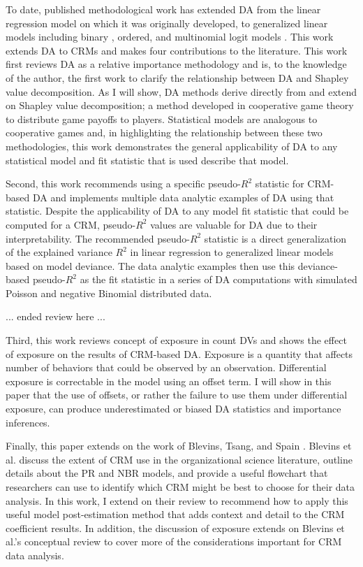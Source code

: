 \documentclass[ShortAfour,times,sageapa]{sagej}
\begin{document}
	To date, published methodological work has extended DA from the linear regression model on which it was originally developed, to generalized linear models including binary \cite{azen2009using}, ordered, and multinomial logit models \cite{luchman2014relative}.	
	This work extends DA to CRMs and makes four contributions to the literature.
	This work first reviews DA as a relative importance methodology and is, to the knowledge of the author, the first work to clarify the relationship between DA and Shapley value decomposition.
	As I will show, DA methods derive directly from and extend on Shapley value decomposition; a method developed in cooperative game theory to distribute game payoffs to players.
	Statistical models are analogous to cooperative games and, in highlighting the relationship between these two methodologies, this work demonstrates the general applicability of DA to any statistical model and fit statistic that is used describe that model.
	
	Second, this work recommends using a specific pseudo-$R^2$ statistic for CRM-based DA and implements multiple data analytic examples of DA using that statistic.
	Despite the applicability of DA to any model fit statistic that could be computed for a CRM, pseudo-$R^2$ values are valuable for DA due to their interpretability. 
	The recommended pseudo-$R^2$ statistic is a direct generalization of the explained variance $R^2$ in linear regression to generalized linear models based on model deviance.
	The data analytic examples then use this deviance-based pseudo-$R^2$ as the fit statistic in a series of DA computations with simulated Poisson and negative Binomial distributed data.
	
		... ended review here ...
	
	Third, this work reviews concept of exposure in count DVs and shows the effect of exposure on the results of CRM-based DA. 
	Exposure is a quantity that affects number of behaviors that could be observed by an observation.
	Differential exposure is correctable in the model using an offset term.
	I will show in this paper that the use of offsets, or rather the failure to use them under differential exposure, can produce underestimated or biased DA statistics and importance inferences.
	
	Finally, this paper extends on the work of Blevins, Tsang, and Spain \citeyear{blevins2015count}. 
	Blevins et al. discuss the extent of CRM use in the organizational science literature, outline details about the PR and NBR models, and provide a useful flowchart that researchers can use to identify which CRM might be best to choose for their data analysis.
	In this work, I extend on their review to recommend how to apply this useful model post-estimation method that adds context and detail to the CRM coefficient results.
	In addition, the discussion of exposure extends on Blevins et al.'s conceptual review to cover more of the considerations important for CRM data analysis.
	
\end{document}
